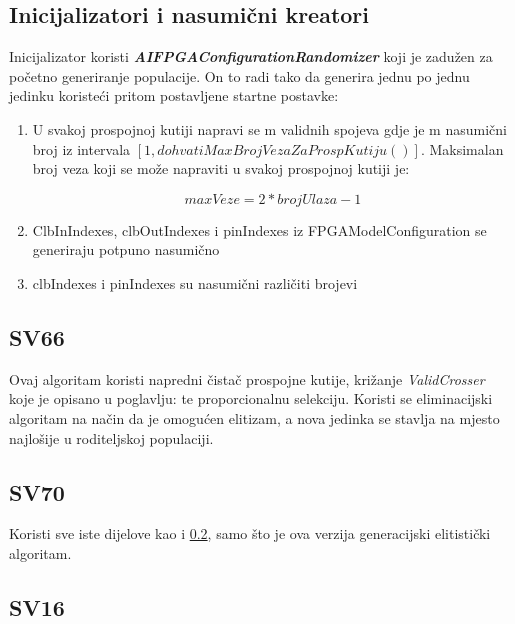 \documentclass[times, utf8, zavrsni]{fer}
\begin{document}
\subsection{Inicijalizatori i nasumični kreatori}

Inicijalizator koristi \textbf{\emph{AIFPGAConfigurationRandomizer}} koji je zadužen za početno generiranje populacije. On to radi tako da generira jednu po jednu jedinku koristeći pritom postavljene startne postavke:

\begin{enumerate}
	\item U svakoj prospojnoj kutiji napravi se m validnih spojeva gdje je m nasumični broj iz intervala $[1, dohvatiMaxBrojVezaZaProspKutiju()]$. Maksimalan broj veza koji se može napraviti u svakoj prospojnoj kutiji je:
	
	\begin{equation}
		maxVeze=2\ast brojUlaza -1
	\end{equation}

	\item ClbInIndexes, clbOutIndexes i pinIndexes iz FPGAModelConfiguration se generiraju potpuno nasumično
	\item clbIndexes i pinIndexes su nasumični različiti brojevi
\end{enumerate}


\subsection{SV66}
\label{SV66}

Ovaj algoritam koristi napredni čistač prospojne kutije, križanje \emph{ValidCrosser} koje je opisano u poglavlju: %
te proporcionalnu selekciju. Koristi se eliminacijski algoritam na način da je omogućen elitizam, a nova jedinka se stavlja na mjesto najlošije u roditeljskoj populaciji. 

\subsection{SV70}
\label{SV70}

Koristi sve iste dijelove kao i \ref{SV66}, samo što je ova verzija generacijski elitistički algoritam.

\subsection{SV16}
\label{SV16}
\end{document}
